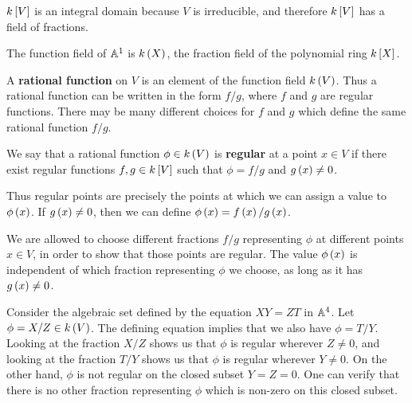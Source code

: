 \begin{note*}
$ k\sbr{V} $ is an integral domain because $ V $ is irreducible, and therefore $ k\sbr{V} $ has a field of fractions.
\end{note*}

\begin{example*}
The function field of $ \AA^1 $ is $ k\br{X} $, the fraction field of the polynomial ring $ k\sbr{X} $.
\end{example*}

\begin{definition*}
A \textbf{rational function} on $ V $ is an element of the function field $ k\br{V} $. Thus a rational function can be written in the form $ f / g $, where $ f $ and $ g $ are regular functions. There may be many different choices for $ f $ and $ g $ which define the same rational function $ f / g $.
\end{definition*}

\begin{definition*}
We say that a rational function $ \phi \in k\br{V} $ is \textbf{regular} at a point $ x \in V $ if there exist regular functions $ f, g \in k\sbr{V} $ such that $ \phi = f / g $ and $ g\br{x} \ne 0 $.
\end{definition*}

Thus regular points are precisely the points at which we can assign a value to $ \phi\br{x} $. If $ g\br{x} \ne 0 $, then we can define $ \phi\br{x} = f\br{x} / g\br{x} $.

\begin{note*}
We are allowed to choose different fractions $ f / g $ representing $ \phi $ at different points $ x \in V $, in order to show that those points are regular. The value $ \phi\br{x} $ is independent of which fraction representing $ \phi $ we choose, as long as it has $ g\br{x} \ne 0 $.
\end{note*}

\begin{example*}
Consider the algebraic set defined by the equation $ XY = ZT $ in $ \AA^4 $. Let $ \phi = X / Z \in k\br{V} $. The defining equation implies that we also have $ \phi = T / Y $. Looking at the fraction $ X / Z $ shows us that $ \phi $ is regular wherever $ Z \ne 0 $, and looking at the fraction $ T / Y $ shows us that $ \phi $ is regular wherever $ Y \ne 0 $. On the other hand, $ \phi $ is not regular on the closed subset $ Y = Z = 0 $. One can verify that there is no other fraction representing $ \phi $ which is non-zero on this closed subset.
\end{example*}


